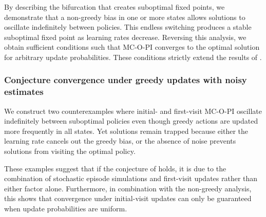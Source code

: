 By describing the bifurcation that creates suboptimal fixed points, we demonstrate that a non-greedy bias in one or more states allows solutions to oscillate indefinitely between policies. This endless switching produces a stable suboptimal fixed point as learning rates decrease.
Reversing this analysis, we obtain sufficient conditions such that MC-O-PI converges to the optimal solution for arbitrary update probabilities. These conditions strictly extend the results of \citet{Wang2022OnLearning}.


\subsubsection{Conjecture convergence under greedy updates with noisy estimates}


We construct two counterexamples where initial- and first-visit MC-O-PI oscillate indefinitely between suboptimal policies even though greedy actions are updated more frequently in all states.
Yet solutions remain trapped because either the learning rate cancels out the greedy bias, or the absence of noise prevents solutions from visiting the optimal policy.

These examples suggest that if the conjecture of \citet[p. 99]{Sutton2018ReinforcementIntroduction} holds, it is due to the combination of stochastic episode simulations
and first-visit updates rather than either factor alone.
Furthermore, in combination with the non-greedy analysis, this shows that convergence under initial-visit updates can only be guaranteed when update probabilities are uniform.





